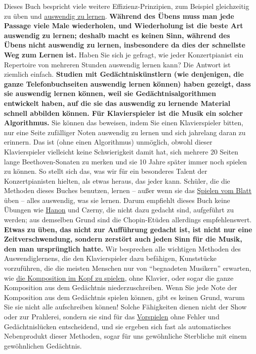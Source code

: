 Dieses Buch bespricht viele weitere Effizienz-Prinzipien, zum Beispiel gleichzeitig zu üben und \hyperref[c1iii6a]{auswendig zu lernen}.
\textbf{Während des Übens muss man jede Passage viele Male wiederholen, und Wiederholung ist die beste Art auswendig zu lernen; deshalb macht es keinen Sinn, während des Übens nicht auswendig zu lernen, insbesondere da dies der schnellste Weg zum Lernen ist.}
Haben Sie sich je gefragt, wie jeder Konzertpianist ein Repertoire von mehreren Stunden auswendig lernen kann?
Die Antwort ist ziemlich einfach.
\textbf{Studien mit Gedächtniskünstlern (wie denjenigen, die ganze Telefonbuchseiten auswendig lernen können) haben gezeigt, dass sie auswendig lernen können, weil sie Gedächtnisalgorithmen entwickelt haben, auf die sie das auswendig zu lernende Material schnell abbilden können.
Für Klavierspieler ist die Musik ein solcher Algorithmus.}
Sie können das beweisen, indem Sie einen Klavierspieler bitten, nur eine Seite zufälliger Noten auswendig zu lernen und sich jahrelang daran zu erinnern.
Das ist (ohne einen Algorithmus) unmöglich, obwohl dieser Klavierspieler vielleicht keine Schwierigkeit damit hat, sich mehrere 20 Seiten lange Beethoven-Sonaten zu merken und sie 10 Jahre später immer noch spielen zu können.
So stellt sich das, was wir für ein besonderes Talent der Konzertpianisten hielten, als etwas heraus, das jeder kann.
Schüler, die die Methoden dieses Buches benutzen, lernen -- außer wenn sie das \hyperref[c1iii11]{Spielen vom Blatt} üben -- alles auswendig, was sie lernen.
Darum empfiehlt dieses Buch keine Übungen wie \hyperref[c1iii7h]{Hanon} und Czerny, die nicht dazu gedacht sind, aufgeführt zu werden; aus demselben Grund sind die Chopin-Etüden allerdings empfehlenswert.
\textbf{Etwas zu üben, das nicht zur Aufführung gedacht ist, ist nicht nur eine Zeitverschwendung, sondern zerstört auch jeden Sinn für die Musik, den man ursprünglich hatte.}
Wir besprechen alle wichtigen Methoden des Auswendiglernens, die den Klavierspieler dazu befähigen, Kunststücke vorzuführen, die die meisten Menschen nur von \enquote{begnadeten Musikern} erwarten, wie 
\hyperref[c1ii12mental]{die Komposition im Kopf zu spielen}, ohne Klavier, oder sogar die ganze Komposition aus dem Gedächtnis niederzuschreiben.
Wenn Sie jede Note der Komposition aus dem Gedächtnis spielen können, gibt es keinen Grund, warum Sie sie nicht alle aufschreiben können!
Solche Fähigkeiten dienen nicht der Show oder zur Prahlerei, sondern sie sind für das \hyperref[c1iii14]{Vorspielen} ohne Fehler und Gedächtnislücken entscheidend, und sie ergeben sich fast als automatisches Nebenprodukt dieser Methoden, sogar für uns gewöhnliche Sterbliche mit einem gewöhnlichen Gedächtnis.
